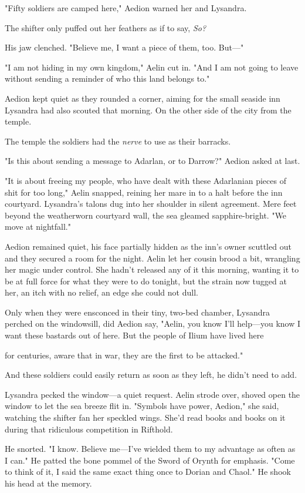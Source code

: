 "Fifty soldiers are camped here," Aedion warned her and Lysandra.

The shifter only puffed out her feathers as if to say, \emph{So?}

His jaw clenched. "Believe me, I want a piece of them, too. But---"

"I am not hiding in my own kingdom," Aelin cut in. "And I am not going to leave without sending a reminder of who this land belongs to."

Aedion kept quiet as they rounded a corner, aiming for the small seaside inn Lysandra had also scouted that morning. On the other side of the city from the temple.

The temple the soldiers had the \emph{nerve} to use as their barracks.

"Is this about sending a message to Adarlan, or to Darrow?" Aedion asked at last.

"It is about freeing my people, who have dealt with these Adarlanian pieces of shit for too long," Aelin snapped, reining her mare in to a halt before the inn courtyard. Lysandra's talons dug into her shoulder in silent agreement. Mere feet beyond the weatherworn courtyard wall, the sea gleamed sapphire-bright. "We move at nightfall."

Aedion remained quiet, his face partially hidden as the inn's owner scuttled out and they secured a room for the night. Aelin let her cousin brood a bit, wrangling her magic under control. She hadn't released any of it this morning, wanting it to be at full force for what they were to do tonight, but the strain now tugged at her, an itch with no relief, an edge she could not dull.

Only when they were ensconced in their tiny, two-bed chamber, Lysandra perched on the windowsill, did Aedion say, "Aelin, you know I'll help---you know I want these bastards out of here. But the people of Ilium have lived here

for centuries, aware that in war, they are the first to be attacked."

And these soldiers could easily return as soon as they left, he didn't need to add.

Lysandra pecked the window---a quiet request. Aelin strode over, shoved open the window to let the sea breeze flit in. "Symbols have power, Aedion," she said, watching the shifter fan her speckled wings. She'd read books and books on it during that ridiculous competition in Rifthold.

He snorted. "I know. Believe me---I've wielded them to my advantage as often as I can." He patted the bone pommel of the Sword of Orynth for emphasis. "Come to think of it, I said the same exact thing once to Dorian and Chaol." He shook his head at the memory.

